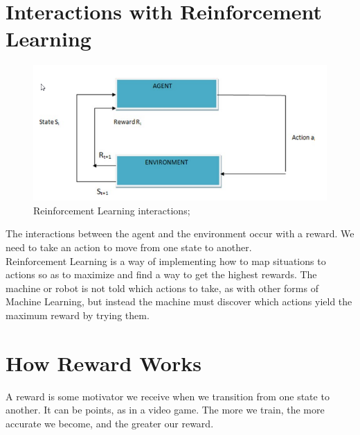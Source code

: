 \documentclass[12pt,a4paper]{article}
\begin{document}
\section{Interactions with Reinforcement Learning}
\begin{figure}[hbt!]
\begin{center}
\includegraphics[scale=0.74]{ Reinforcement Learning interactions}
\caption{Reinforcement Learning interactions; }%
\end{center}
\end{figure}

The interactions between the agent and the environment occur with a reward. 
We need to take an action to move from one state to another.\\
Reinforcement Learning is a way of implementing how to map situations to actions 
so as to maximize and find a way to get the highest rewards.
The machine or robot is not told which actions to take, as with other forms of 
Machine Learning, but instead the machine must discover which actions yield the 
maximum reward by trying them.\\

\section{How Reward Works}
A reward is some motivator we receive when we transition from one state to another. It 
can be points, as in a video game. The more we train, the more accurate we become, and 
the greater our reward.\\
\end{document}
